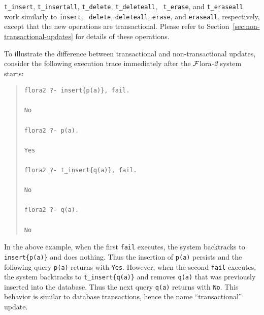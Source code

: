 \documentclass[11pt]{article}
\newcommand{\FLORA}{{\mbox{\sc ${\cal F}${lora}\rm\emph{-2}}}\xspace}
\begin{document}
{\tt t\_insert}, {\tt t\_insertall}, {\tt t\_delete}, {\tt t\_deleteall}, {\tt
  t\_erase}, and {\tt t\_eraseall} work similarly to {\tt insert}, {\tt
  delete}, {\tt deleteall}, {\tt erase}, and {\tt eraseall}, respectively,
except that the new operations are transactional.  Please refer to
Section~\ref{sec:non-transactional-updates} for details of these
operations.

To illustrate the difference between transactional and
non-transactional updates, consider the following execution trace
immediately after the \FLORA system starts:
\begin{quote}
\begin{verbatim}
flora2 ?- insert{p(a)}, fail.

No

flora2 ?- p(a).

Yes

flora2 ?- t_insert{q(a)}, fail.

No

flora2 ?- q(a).

No
\end{verbatim}
\end{quote}
In the above example, when the first \verb|fail| executes, the system
backtracks to {\tt insert\{p(a)\}} and does nothing. Thus the insertion
of {\tt p(a)} persists and the following query \verb|p(a)| returns
with {\tt Yes}. However, when the second \verb|fail| executes, the
system backtracks to {\tt t\_insert\{q(a)\}} and removes {\tt q(a)} that
was previously inserted into the database. Thus the next query
\verb|q(a)| returns with {\tt No}. This behavior is similar to database
transactions, hence the name ``transactional'' update.
\end{document}

